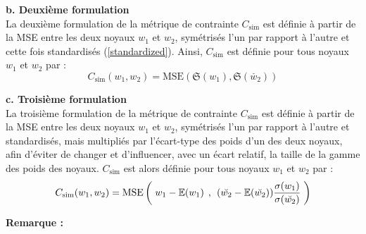 \vspace{3.5mm}
\noindent \textbf{b. Deuxième formulation} \\

\vspace{-1.5mm}
La deuxième formulation de la métrique de contrainte $C_\text{sim}$ est définie à partir de la MSE entre les deux noyaux $w_1$ et $w_2$, symétrisés l'un par rapport à l'autre et cette fois standardisés (\ref{standardized}). Ainsi, $C_\text{sim}$ est définie pour tous noyaux $w_1$ et $w_2$ par : \\

\vspace{-4.7mm}
\begin{equation}
    C_\text{sim}(w_1,w_2) = \text{MSE} \left ( \mathfrak{S}(w_1) , \mathfrak{S}(\breve{w_2}) \right )
    \label{Csim2}
\end{equation}

\vspace{3.5mm}
\noindent \textbf{c. Troisième formulation} \\

\vspace{-1.5mm}
La troisième formulation de la métrique de contrainte $C_\text{sim}$ est définie à partir de la MSE entre les deux noyaux $w_1$ et $w_2$, symétrisés l'un par rapport à l'autre et standardisés, mais multipliés par l'écart-type des poids d'un des deux noyaux, afin d'éviter de changer et d'influencer, avec un écart relatif, la taille de la gamme des poids des noyaux. $C_\text{sim}$ est alors définie pour tous noyaux $w_1$ et $w_2$ par : \\

\vspace{-4.7mm}
\begin{equation}
    C_\text{sim}(w_1,w_2) = \text{MSE} \left ( \hspace{1mm}  w_1 - \mathbb{E}(w_1) \hspace{1.5mm},\hspace{1.5mm} ( \breve{w_2} - \mathbb{E}(\breve{w_2}) ) \frac{\sigma(w_1)}{\sigma(\breve{w_2})}  \hspace{1mm} \right )
    \label{Csim3}
\end{equation}

\vspace{3.6mm}
\noindent \textbf{Remarque :} \\

